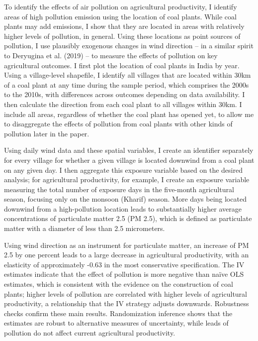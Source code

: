 \documentclass[
]{article}
\begin{document}
To identify the effects of air pollution on agricultural productivity, I identify areas of high pollution emission using the location of coal plants. While coal plants may add emissions, I show that they are located in areas with relatively higher levels of pollution, in general. Using these locations as point sources of pollution, I use plausibly exogenous changes in wind direction -- in a similar spirit to Deryugina et al. (2019) -- to measure the effects of pollution on key agricultural outcomes. I first plot the location of coal plants in India by year. Using a village-level shapefile, I identify all villages that are located within 30km of a coal plant at any time during the sample period, which comprises the 2000s to the 2010s, with differences across outcomes depending on data availability. I then calculate the direction from each coal plant to all villages within 30km. I include all areas, regardless of whether the coal plant has opened yet, to allow me to disaggregate the effects of pollution from coal plants with other kinds of pollution later in the paper.

Using daily wind data and these spatial variables, I create an identifier separately for every village for whether a given village is located downwind from a coal plant on any given day. I then aggregate this exposure variable based on the desired analysis; for agricultural productivity, for example, I create an exposure variable measuring the total number of exposure days in the five-month agricultural season, focusing only on the monsoon (Kharif) season. More days being located downwind from a high-pollution location leads to substantially higher average concentrations of particulate matter 2.5 (PM 2.5), which is defined as particulate matter with a diameter of less than 2.5 micrometers.

Using wind direction as an instrument for particulate matter, an increase of PM 2.5 by one percent leads to a large decrease in agricultural productivity, with an elasticity of approximately -0.63 in the most conservative specification. The IV estimates indicate that the effect of pollution is more negative than naïve OLS estimates, which is consistent with the evidence on the construction of coal plants; higher levels of pollution are correlated with higher levels of agricultural productivity, a relationship that the IV strategy adjusts downwards. Robustness checks confirm these main results. Randomization inference shows that the estimates are robust to alternative measures of uncertainty, while leads of pollution do not affect current agricultural productivity.
\end{document}
